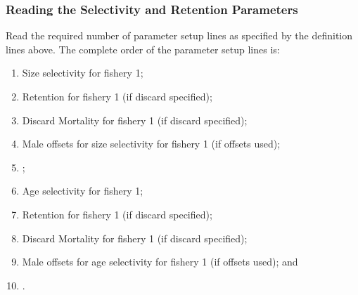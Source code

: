 \subsubsection{Reading the Selectivity and Retention Parameters}
Read the required number of parameter setup lines as specified by the definition lines above. The complete order of the parameter setup lines is:
\begin{enumerate}
	\item Size selectivity for fishery 1;
	\item Retention for fishery 1 (if discard specified);
	\item Discard Mortality for fishery 1 (if discard specified);
	\item Male offsets for size selectivity for fishery 1 (if offsets used);
	\item <repeat for additional fleets and surveys>;
	\item Age selectivity for fishery 1;
	\item Retention for fishery 1 (if discard specified);
	\item Discard Mortality for fishery 1 (if discard specified);
	\item Male offsets for age selectivity for fishery 1 (if offsets used); and
	\item <repeat for additional fleets and surveys>.
\end{enumerate}


